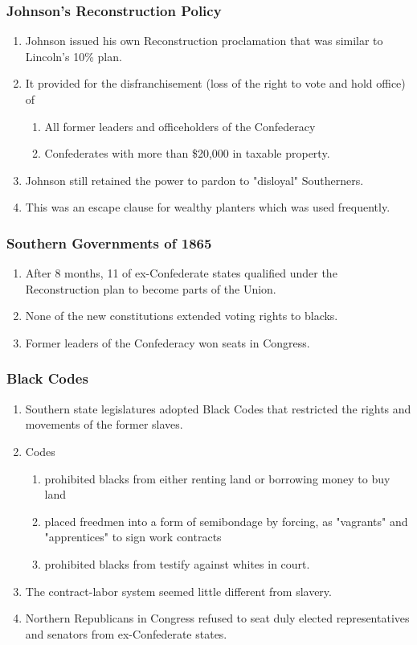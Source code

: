 \documentclass[12pt]{article} %
\begin{document}
\subsubsection{Johnson's Reconstruction Policy}
\begin{enumerate}
	\item Johnson issued his own Reconstruction proclamation that was similar to Lincoln's 10\% plan.
	\item It provided for the disfranchisement (loss of the right to vote and hold office) of 
	\begin{enumerate}
		\item All former leaders and officeholders of the Confederacy
		\item Confederates with more than \$20,000 in taxable property.
	\end{enumerate}
	\item Johnson still retained the power to pardon to "disloyal" Southerners.
	\item This was an escape clause for wealthy planters which was used frequently.
\end{enumerate}

\subsubsection{Southern Governments of 1865}
\begin{enumerate}
	\item After 8 months, 11 of ex-Confederate states qualified under the Reconstruction plan to 
		become parts of the Union.
	\item None of the new constitutions extended voting rights to blacks. 
	\item Former leaders of the Confederacy won seats in Congress.
\end{enumerate}

\subsubsection{Black Codes}
\begin{enumerate}
	\item Southern state legislatures adopted Black Codes that restricted the rights and movements
		of the former slaves.
	\item Codes 
	\begin{enumerate}
		\item prohibited blacks from either renting land or borrowing money to buy land
		\item placed freedmen into a form of semibondage by forcing, as "vagrants" and "apprentices"
			to sign work contracts
		\item prohibited blacks from testify against whites in court.
	\end{enumerate}
	\item The contract-labor system seemed little different from slavery.
	\item Northern Republicans in Congress refused to seat duly elected representatives and senators
		from ex-Confederate states.
\end{enumerate}
\end{document}
